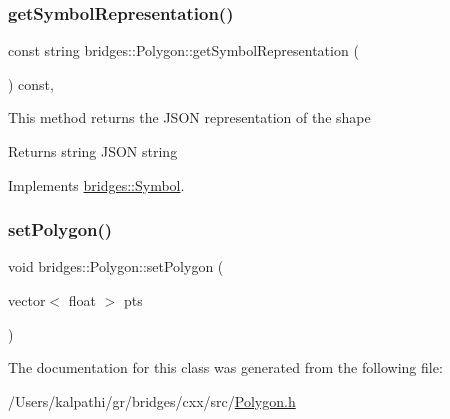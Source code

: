 \subsubsection{\texorpdfstring{getSymbolRepresentation()}{getSymbolRepresentation()}}
{\footnotesize\ttfamily const string bridges\+::\+Polygon\+::get\+Symbol\+Representation (\begin{DoxyParamCaption}{ }\end{DoxyParamCaption}) const\hspace{0.3cm}{\ttfamily [inline]}, {\ttfamily [virtual]}}

This method returns the J\+S\+ON representation of the shape

\begin{DoxyReturn}{Returns}
string J\+S\+ON string 
\end{DoxyReturn}


Implements \mbox{\hyperlink{classbridges_1_1_symbol_ab4dd31fbc736b2e58e8b8bb8446eac73}{bridges\+::\+Symbol}}.

\mbox{\label{classbridges_1_1_polygon_a43ffa2f8767318c9c831dad9ed030679}} 
\subsubsection{\texorpdfstring{setPolygon()}{setPolygon()}}
{\footnotesize\ttfamily void bridges\+::\+Polygon\+::set\+Polygon (\begin{DoxyParamCaption}\item[{vector$<$ float $>$}]{pts }\end{DoxyParamCaption})\hspace{0.3cm}{\ttfamily [inline]}}



The documentation for this class was generated from the following file\+:\begin{DoxyCompactItemize}
\item 
/\+Users/kalpathi/gr/bridges/cxx/src/\mbox{\hyperlink{_polygon_8h}{Polygon.\+h}}\end{DoxyCompactItemize}
